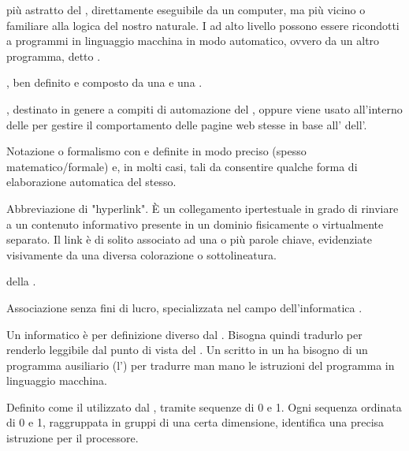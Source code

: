 { 
{ più astratto del , direttamente eseguibile da un computer, ma più vicino o familiare alla logica del nostro  naturale. I  ad alto livello possono essere ricondotti a programmi in linguaggio macchina in modo automatico, ovvero da un altro programma, detto .}


{, ben definito e composto da una  e una .}

{, destinato in genere a compiti di automazione del , oppure viene usato all'interno delle  per gestire il comportamento delle pagine web stesse in base all'  dell'.}

{Notazione o formalismo con  e  definite in modo preciso (spesso matematico/formale) e, in molti casi, tali da consentire qualche forma di elaborazione automatica del  stesso.}

{Abbreviazione di "hyperlink". \`{E} un collegamento ipertestuale in grado di rinviare a un contenuto informativo presente in un dominio fisicamente o virtualmente separato. Il link è di solito associato ad una o più parole chiave, evidenziate visivamente da una diversa colorazione o sottolineatura.}

{ della .}

{Associazione senza fini di lucro, specializzata nel campo dell'informatica .}

{Un  informatico è per definizione diverso dal . Bisogna quindi tradurlo per renderlo leggibile dal punto di vista del . Un  scritto in un  ha bisogno di un programma ausiliario (l') per tradurre man mano le istruzioni del programma in linguaggio macchina.}

{Definito come il  utilizzato dal , tramite sequenze di 0 e 1. Ogni sequenza ordinata di 0 e 1, raggruppata in gruppi di una certa dimensione, identifica una precisa istruzione per il processore.}

}
